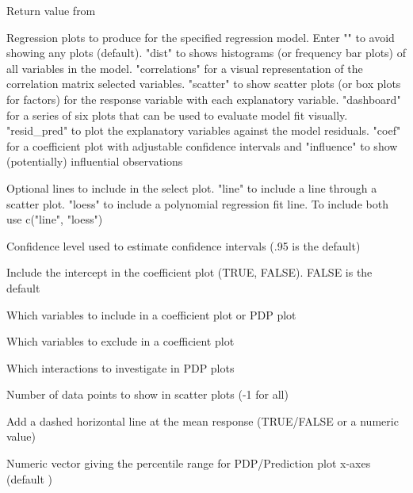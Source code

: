 \documentclass[a4paper]{book}
\begin{document}
\begin{Arguments}
\begin{ldescription}
\item[\code{x}] Return value from 

\item[\code{plots}] Regression plots to produce for the specified regression model. Enter "" to avoid showing any plots (default). "dist" to shows histograms (or frequency bar plots) of all variables in the model. "correlations" for a visual representation of the correlation matrix selected variables. "scatter" to show scatter plots (or box plots for factors) for the response variable with each explanatory variable. "dashboard" for a series of six plots that can be used to evaluate model fit visually. "resid\_pred" to plot the explanatory variables against the model residuals. "coef" for a coefficient plot with adjustable confidence intervals and "influence" to show (potentially) influential observations

\item[\code{lines}] Optional lines to include in the select plot. "line" to include a line through a scatter plot. "loess" to include a polynomial regression fit line. To include both use c("line", "loess")

\item[\code{conf\_lev}] Confidence level used to estimate confidence intervals (.95 is the default)

\item[\code{intercept}] Include the intercept in the coefficient plot (TRUE, FALSE). FALSE is the default

\item[\code{incl}] Which variables to include in a coefficient plot or PDP plot

\item[\code{excl}] Which variables to exclude in a coefficient plot

\item[\code{incl\_int}] Which interactions to investigate in PDP plots

\item[\code{nrobs}] Number of data points to show in scatter plots (-1 for all)

\item[\code{hline}] Add a dashed horizontal line at the mean response (TRUE/FALSE or a numeric value)

\item[\code{pdp\_range}] Numeric vector  giving the percentile range for PDP/Prediction plot x-axes (default )


\end{ldescription}
\end{Arguments}
\end{document}
